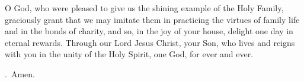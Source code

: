 \lettrine[lines=3]{O}{} God, who were pleased to give us
the shining example of the Holy Family,
graciously grant that we may imitate them
in practicing the virtues of family life and in the bonds of charity,
and so, in the joy of your house,
delight one day in eternal rewards.
Through our Lord Jesus Christ, your Son,
who lives and reigns with you in the unity of the Holy Spirit,
one God, for ever and ever. \par \Rbar.~Amen.
